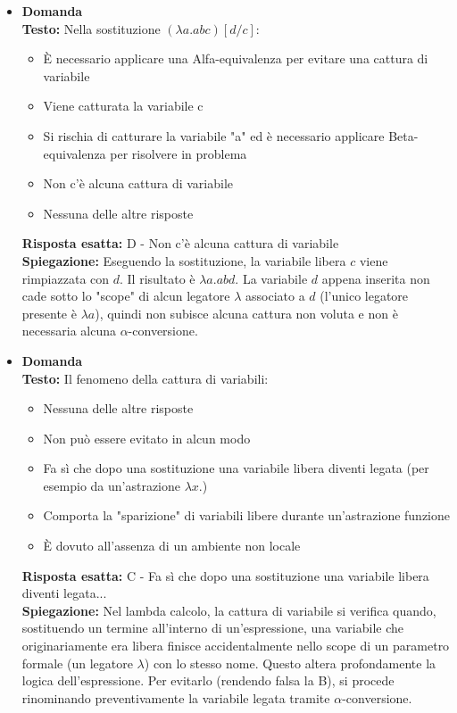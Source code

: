 \documentclass[12pt, a4paper]{article}
\newcounter{domandateoria}
\begin{document}
\begin{itemize}
    \item {}\textbf{Domanda \thedomandateoria} \\
    \textbf{Testo:} Nella sostituzione $(\lambda a.abc)[d/c]$:
    \begin{itemize}
        \item[A)] È necessario applicare una Alfa-equivalenza per evitare una cattura di variabile
        \item[B)] Viene catturata la variabile c
        \item[C)] Si rischia di catturare la variabile "a" ed è necessario applicare Beta-equivalenza per risolvere in problema
        \item[D)] Non c'è alcuna cattura di variabile
        \item[E)] Nessuna delle altre risposte
    \end{itemize}
    \textbf{Risposta esatta:} D - Non c'è alcuna cattura di variabile \\
    \textbf{Spiegazione:} Eseguendo la sostituzione, la variabile libera $c$ viene rimpiazzata con $d$. Il risultato è $\lambda a.abd$. La variabile $d$ appena inserita non cade sotto lo "scope" di alcun legatore $\lambda$ associato a $d$ (l'unico legatore presente è $\lambda a$), quindi non subisce alcuna cattura non voluta e non è necessaria alcuna $\alpha$-conversione.
    \vspace{0.3cm}

    \item {}\textbf{Domanda \thedomandateoria} \\
    \textbf{Testo:} Il fenomeno della cattura di variabili:
    \begin{itemize}
        \item[A)] Nessuna delle altre risposte
        \item[B)] Non può essere evitato in alcun modo
        \item[C)] Fa sì che dopo una sostituzione una variabile libera diventi legata (per esempio da un'astrazione $\lambda x.$)
        \item[D)] Comporta la "sparizione" di variabili libere durante un'astrazione funzione
        \item[E)] È dovuto all'assenza di un ambiente non locale
    \end{itemize}
    \textbf{Risposta esatta:} C - Fa sì che dopo una sostituzione una variabile libera diventi legata... \\
    \textbf{Spiegazione:} Nel lambda calcolo, la cattura di variabile si verifica quando, sostituendo un termine all'interno di un'espressione, una variabile che originariamente era libera finisce accidentalmente nello scope di un parametro formale (un legatore $\lambda$) con lo stesso nome. Questo altera profondamente la logica dell'espressione. Per evitarlo (rendendo falsa la B), si procede rinominando preventivamente la variabile legata tramite $\alpha$-conversione.
    \vspace{0.3cm}


\end{itemize}
\end{document}
